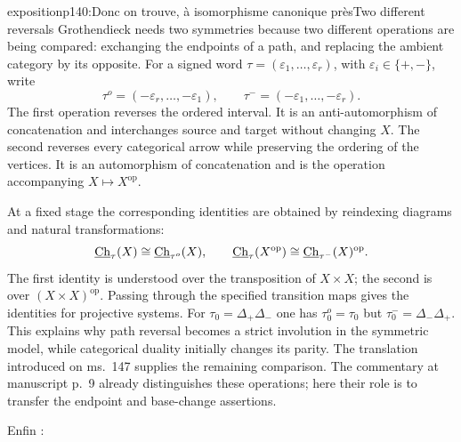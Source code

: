 \begin{dcomment}{exposition}{p140:Donc on trouve, à isomorphisme canonique près}{Two different reversals}
Grothendieck needs two symmetries because two different operations are being compared: exchanging the endpoints of a path, and replacing the ambient category by its opposite. For a signed word $\tau=(\varepsilon_1,\ldots,\varepsilon_r)$, with $\varepsilon_i\in\{+,-\}$, write
\[
 \tau^o=(-\varepsilon_r,\ldots,-\varepsilon_1),
 \qquad
 \tau^-=(-\varepsilon_1,\ldots,-\varepsilon_r).
\]
The first operation reverses the ordered interval. It is an anti-automorphism of concatenation and interchanges source and target without changing $X$. The second reverses every categorical arrow while preserving the ordering of the vertices. It is an automorphism of concatenation and is the operation accompanying $X\mapsto X^{\mathrm{op}}$.

At a fixed stage the corresponding identities are obtained by reindexing diagrams and natural transformations:
\[
 \underline{\mathrm{Ch}}_\tau(X)\cong\underline{\mathrm{Ch}}_{\tau^o}(X),
 \qquad
 \underline{\mathrm{Ch}}_\tau(X^{\mathrm{op}})
          \cong\underline{\mathrm{Ch}}_{\tau^-}(X)^{\mathrm{op}}.
\]
The first identity is understood over the transposition of $X\times X$; the second is over $(X\times X)^{\mathrm{op}}$. Passing through the specified transition maps gives the identities for projective systems. For $\tau_0=\Delta_+\Delta_-$ one has $\tau_0^o=\tau_0$ but $\tau_0^-=\Delta_-\Delta_+$. This explains why path reversal becomes a strict involution in the symmetric model, while categorical duality initially changes its parity. The translation introduced on ms.~147 supplies the remaining comparison. The commentary at manuscript p.~9 already distinguishes these operations; here their role is to transfer the endpoint and base-change assertions.
\end{dcomment}


Enfin :

